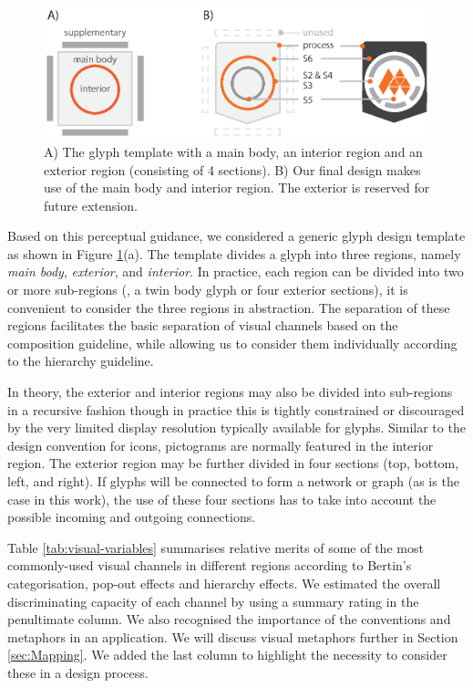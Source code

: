 \begin{figure}[t]
\centering
\includegraphics[width=.7\textwidth]{images/glyph-taxonomy/glyph-space.eps}
\caption{A) The glyph template with a main body, an interior region and an exterior region (consisting of 4 sections).
B) Our final design makes use of the main body and interior region.
The exterior is reserved for future extension.
}
\label{fig:glyph-design}
\vspace{-10pt}
\end{figure}

Based on this perceptual guidance, we considered a generic glyph design template as shown in Figure \ref{fig:glyph-design}(a).
The template divides a glyph into three regions, namely \emph{main body}, \emph{exterior}, and \emph{interior}.
In practice, each region can be divided into two or more sub-regions (\eg, a twin body glyph or four exterior sections), it is convenient to consider the three regions in abstraction.
The separation of these regions facilitates the basic separation of visual channels based on the composition guideline, while allowing us to consider them individually according to the hierarchy guideline.

In theory, the exterior and interior regions may also be divided into sub-regions in a recursive fashion though in practice this is tightly constrained or discouraged by the very limited display resolution typically available for glyphs.
Similar to the design convention for icons, pictograms are normally featured in the interior region.
The exterior region may be further divided in four sections (top, bottom, left, and right).
If glyphs will be connected to form a network or graph (as is the case in this work), the use of these four sections has to take into account the possible incoming and outgoing connections.

Table \ref{tab:visual-variables} summarises relative merits of some of the most commonly-used visual channels in different regions according to Bertin's categorisation, pop-out effects and hierarchy effects.
We estimated the overall discriminating capacity of each channel by using a summary rating in the penultimate column.
We also recognised the importance of the conventions and metaphors in an application.
We will discuss visual metaphors further in Section \ref{sec:Mapping}.
We added the last column to highlight the necessity to consider these in a design process.

